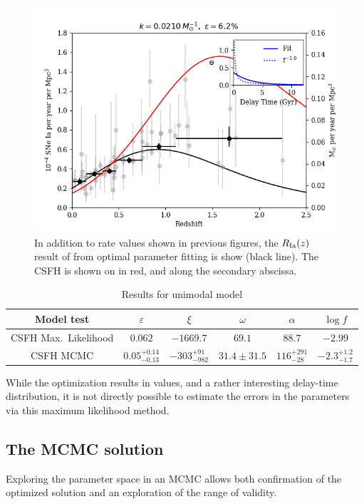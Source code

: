 \documentclass[apj]{aastex}
\begin{document}
\begin{figure}[t] %
   \centering
   \includegraphics[width=6.5in]{figure_sfd_optimized} 
   \caption{\footnotesize In addition to rate values shown in previous figures, the $R_{\rm Ia}(z)$ result of from optimal parameter fitting is show (black line). The CSFH is shown on in red, and along the secondary abscissa. }
   \label{fig:sfd_optimized_curvefit}
\end{figure}

\begin{table}
    \centering
    \caption{Results for unimodal model}
    \label{tab:results}
    \begin{tabular}{cccccc}
        \hline
                Model test & $\varepsilon$ & $\xi$ & $\omega$ & $\alpha$ & $\log f$ \\ 
                \hline
		CSFH Max.~Likelihood &$0.062$&$-1669.7$& $69.1$& $88.7$& $-2.99$\\
                CSFH MCMC & $0.05^{+0.14}_{-0.13}$ & $-303^{+91}_{-982}$ &$31.4\pm{31.5}$  & $116^{+291}_{-28}$ & $-2.3^{+1.2}_{-1.7}$ \\ 
                \hline
    \end{tabular}
\end{table}

While the optimization results in values, and a rather interesting delay-time distribution, it is not directly possible to estimate the errors in the parameters via this maximum likelihood method.

\subsection{The MCMC solution}
Exploring the parameter space in an MCMC allows both confirmation of the optimized solution and an exploration of the range of validity.
\end{document}
